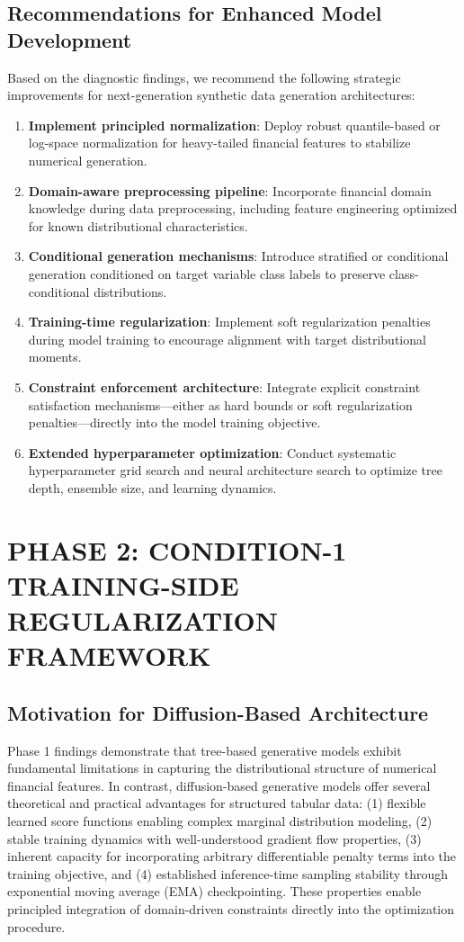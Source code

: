 \documentclass[10pt,conference,a4paper]{IEEEtran}
\begin{document}
\subsection{Recommendations for Enhanced Model Development}
Based on the diagnostic findings, we recommend the following strategic improvements for next-generation synthetic data generation architectures:
\begin{enumerate}
    \item \textbf{Implement principled normalization}: Deploy robust quantile-based or log-space normalization for heavy-tailed financial features to stabilize numerical generation.
    \item \textbf{Domain-aware preprocessing pipeline}: Incorporate financial domain knowledge during data preprocessing, including feature engineering optimized for known distributional characteristics.
    \item \textbf{Conditional generation mechanisms}: Introduce stratified or conditional generation conditioned on target variable class labels to preserve class-conditional distributions.
    \item \textbf{Training-time regularization}: Implement soft regularization penalties during model training to encourage alignment with target distributional moments.
    \item \textbf{Constraint enforcement architecture}: Integrate explicit constraint satisfaction mechanisms---either as hard bounds or soft regularization penalties---directly into the model training objective.
    \item \textbf{Extended hyperparameter optimization}: Conduct systematic hyperparameter grid search and neural architecture search to optimize tree depth, ensemble size, and learning dynamics.
\end{enumerate}

\section{PHASE 2: CONDITION-1 TRAINING-SIDE REGULARIZATION FRAMEWORK}

\subsection{Motivation for Diffusion-Based Architecture}
Phase 1 findings demonstrate that tree-based generative models exhibit fundamental limitations in capturing the distributional structure of numerical financial features. In contrast, diffusion-based generative models offer several theoretical and practical advantages for structured tabular data: (1) flexible learned score functions enabling complex marginal distribution modeling, (2) stable training dynamics with well-understood gradient flow properties, (3) inherent capacity for incorporating arbitrary differentiable penalty terms into the training objective, and (4) established inference-time sampling stability through exponential moving average (EMA) checkpointing. These properties enable principled integration of domain-driven constraints directly into the optimization procedure.
\end{document}
